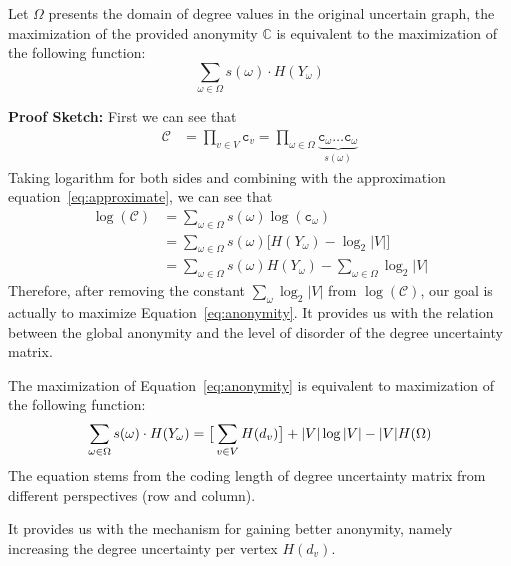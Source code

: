 \begin{lemma}
Let $\Omega$ presents the domain of degree values in the original uncertain graph, the maximization of the provided anonymity $\mathbb{C}$ is equivalent to the maximization of the following function:
  \begin{equation}
      \sum_{\omega \in \Omega} s(\omega) \cdot H(Y_{\omega}) 
      \label{eq:anonymity}
  \end{equation} 
\end{lemma}

{\bf Proof Sketch:} First we can see that 
\begin{align*}
    \mathcal{C} &= \prod_{v \in V} \mathtt{c}_{v} 
                 = \prod_{\omega \in \Omega} \underbrace{\mathtt{c_{\omega}} \ldots \mathtt{c}_{\omega}}_{s(\omega)} 
\end{align*}
Taking logarithm for both sides and combining with the approximation equation~\ref{eq:approximate}, we can see that 
\begin{align*}
    \log(\mathcal{C}) &=\sum_{\omega \in \Omega} s(\omega) \log(\mathtt{c_{\omega}}) \\
                      &=\sum_{\omega \in \Omega} s(\omega) \big[ H(Y_{\omega})-\log_{2}{|V|} \big] \\
                      &=\sum_{\omega  \in \Omega} s(\omega) H(Y_{\omega}) -\sum_{\omega  \in \Omega} \log_{2}{|V|}
\end{align*}
Therefore, after removing the constant $\sum_{\omega} \log_{2}|V|$ from $\log(\mathcal{C})$, our goal is actually to maximize Equation~\ref{eq:anonymity}. It provides us with the relation between the global anonymity and the level of disorder of the degree uncertainty matrix.  

\begin{lemma}
The maximization of Equation~\ref{eq:anonymity} is equivalent to maximization of the following function:
  \begin{equation}
      \small{\sum_{\omega \in \Omega} s(\omega) \cdot H(Y_{\omega}) =\big[ \sum_{v \in V} H(d_{v})\big] + |V|\log{|V|}-|V|H(\Omega)}
  \end{equation}
The equation stems from the coding length of degree uncertainty matrix from different perspectives (row and column).
\end{lemma}
It provides us with the mechanism for gaining better anonymity, namely increasing the degree uncertainty per vertex $H(d_{v})$. 

